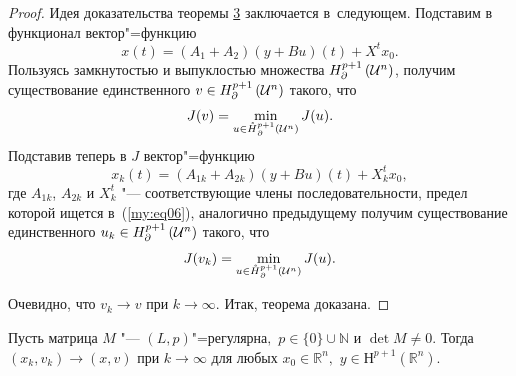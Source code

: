 \smallskip
\begin{proof}
Идея доказательства теоремы \hyperlink{svir:th:3}3 заключается в~следующем. 
Подставим в функционал вектор"=функцию
\begin{equation}
\label{my:eq11}
x(t) = \left( A_{1} + A_{2} \right) \left( y+Bu \right) (t) + X^t x_{0}.
\end{equation}
Пользуясь замкнутостью и выпуклостью множества ${H^{p+1}_{\partial}}\left({\cal U}^{n} \right)$, получим
существование единственного  $v\in {H^{p+1}_{\partial}}\left({\cal U}^{n} \right)$ такого, что
\begin{equation*}
J(v)=\min\limits_{u\in\mathring{H}{}^{p+1}_{\partial}\left({\cal U}^{n} \right)} J(u).
\end{equation*}
Подставив теперь в $J$ вектор"=функцию
\begin{equation}
\label{my:eq10}
x_{k} (t) = \left( A_{1k} + A_{2k} \right) \left( y+Bu \right) (t) + X^{t}_{k} x_{0},
\end{equation}
где $ A_{1k}$, $A_{2k}$ и 
$X^{t}_{k}$ "--- соответствующие члены последовательности, предел которой ищется в~(\ref{my:eq06}),
аналогично предыдущему получим существование единственного  $u_{k} \in {H^{p+1}_{\partial}}\left({\cal U}^{n} \right)$
такого, что
\begin{equation*}
J(v_{k})=\min\limits_{u\in\mathring{H}{}^{p+1}_{\partial}\left({\cal U}^{n} \right)} J(u).
\end{equation*}

Очевидно, что $v_{k} \rightarrow v$ при $k\rightarrow\infty$. Итак, теорема доказана.
\end{proof}

\smallskip

\hypertarget{svir:lemma:1}{}

\begin{lemma}[1]Пусть матрица $M$ "--- $(L,p)$"=регулярна$,$ $p\in\{0\}\cup{\mathbb N}$ и \mbox{$\det M\neq 0.$}
 Тогда $(x_{k}, v_{k}) \rightarrow (x,v) $ при $k\rightarrow\infty$ для любых $x_{0}\in{\mathbb R}^{n},$
 $y \in Н^{p+1} \left( {\mathbb R}^{n} \right)$.
\end{lemma}

